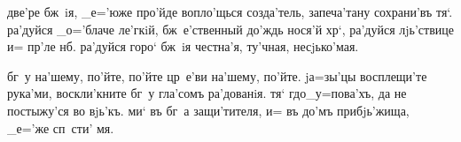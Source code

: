     две'ре бж~iя, 
_е='юже про'йде вопло'щься созда'тель, запеча'тану 
сохрани'въ тя`. ра'дуйся _о='блаче ле'гкiй, бж~е'ственный 
до'ждь нося'й хр`, ра'дуйся лjь'ствице и= пр'ле 
нб. ра'дуйся горо` бж~iя честна'я, ту'чная, 
несjько'мая.

    бг~у на'шему, 
по'йте, по'йте цр~е'ви на'шему, по'йте.   
jа=зы'цы восплещи'те рука'ми, воскли'кните бг~у гла'сомъ 
ра'дованiя.   тя` гд о_у=пова'хъ, да 
не постыжу'ся во вjь'къ.   ми` въ бг~а 
защи'тителя, и= въ до'мъ прибjь'жища, _е='же сп~сти' мя.

